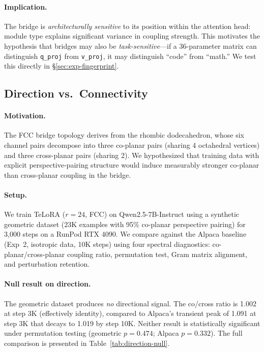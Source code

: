 \paragraph{Implication.}
The bridge is \emph{architecturally sensitive} to its position within the
attention head: module type explains significant variance in coupling
strength. This motivates the hypothesis that bridges may also be
\emph{task-sensitive}---if a 36-parameter matrix can distinguish
\texttt{q\_proj} from \texttt{v\_proj}, it may distinguish ``code'' from
``math.'' We test this directly in \S\ref{sec:exp-fingerprint}.

\subsection{Direction vs.\ Connectivity}
\label{sec:exp-direction}

\paragraph{Motivation.}
The FCC bridge topology derives from the rhombic dodecahedron, whose six
channel pairs decompose into three co-planar pairs (sharing 4 octahedral
vertices) and three cross-planar pairs (sharing 2). We hypothesized that
training data with explicit perspective-pairing structure would induce
measurably stronger co-planar than cross-planar coupling in the bridge.

\paragraph{Setup.}
We train TeLoRA ($r\!=\!24$, FCC) on Qwen2.5-7B-Instruct using a
synthetic geometric dataset (23K examples with 95\% co-planar perspective
pairing) for 3,000 steps on a RunPod RTX 4090. We compare against the
Alpaca baseline (Exp~2, isotropic data, 10K steps) using four spectral
diagnostics: co-planar/cross-planar coupling ratio, permutation test,
Gram matrix alignment, and perturbation retention.

\paragraph{Null result on direction.}
The geometric dataset produces \emph{no} directional signal. The co/cross
ratio is 1.002 at step 3K (effectively identity), compared to Alpaca's
transient peak of 1.091 at step 3K that decays to 1.019 by step 10K.
Neither result is statistically significant under permutation testing
(geometric $p = 0.474$; Alpaca $p = 0.332$). The full comparison is
presented in Table~\ref{tab:direction-null}.

